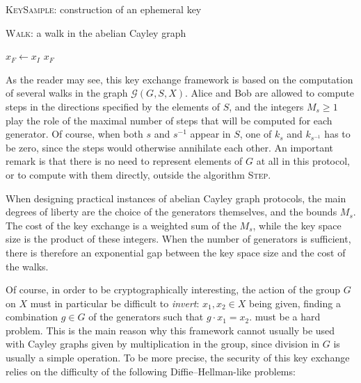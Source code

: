 \documentclass{article}
\newcommand{\Graph}{\mathcal{G}}
\newcommand{\algnamestyle}[1]{\textsc{#1}}
\theoremstyle{definition}
\begin{document}
\begin{algorithm}
	\caption{\algnamestyle{KeySample}: construction of an ephemeral key}
	\label{alg:key}
\end{algorithm}

\begin{algorithm}
	\caption{\algnamestyle{Walk}: a walk in the abelian Cayley graph}
	\label{alg:walk}
	$x_F\gets x_I$\;
	\For{$s\in S$}{
		\lFor{\(0 \le i < k_s\)}{
			$x_F\gets$ \algnamestyle{Step}$(s, x_F)$
		}
	}
	\Return $x_F$
\end{algorithm}

As the reader may see, this key exchange framework is based on the computation
of several walks in the graph $\Graph(G, S, X)$. Alice and Bob are allowed to
compute steps in the directions specified by the elements of $S$, and the integers
$M_s\geq 1$ play the role of the maximal number of steps that will be computed
for each generator. Of course, when both $s$ and $s^{-1}$ appear in $S$, one
of $k_s$ and $k_{s^{-1}}$ has to be zero, since the steps would otherwise
annihilate each other.
An important remark is that there is no need to represent
elements of $G$ at all in this protocol, or to compute with them directly,
outside the algorithm \algnamestyle{Step}.

When designing practical instances of abelian Cayley graph
protocols, the main degrees of liberty are the choice of the generators themselves,
and the bounds $M_s$. The cost of the key exchange is a weighted
sum of the $M_s$, while the key space size is the product of these integers. When
the number of generators is sufficient, there is therefore an exponential gap
between the key space size and the cost of the walks.

Of course, in order to be
cryptographically interesting, the action of the group $G$ on $X$ must in particular
be difficult to \emph{invert}: $x_1, x_2\in X$ being given, finding a combination
$g\in G$ of the generators such that $g\cdot x_1 = x_2$. must be a hard problem.
This is the main reason why this framework cannot usually be used with
Cayley graphs given by multiplication in the group, since division in $G$ is usually
a simple operation. To be more precise, the security of this key exchange relies
on the difficulty of the following Diffie--Hellman-like problems:
\end{document}
